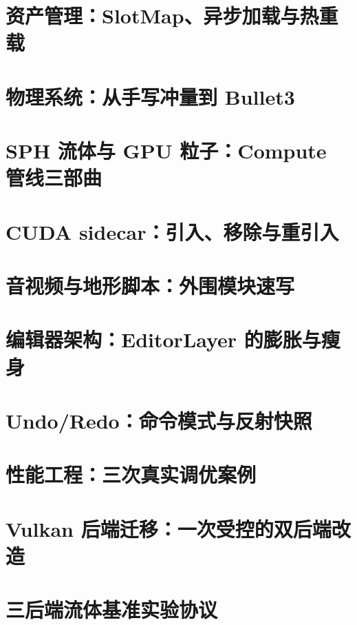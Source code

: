 \documentclass[%
  lang=cn,          %
  newtx,            %
  12pt,             %
  oneside,          %
  scheme=warmgreen, %
]{elegantbook}
\begin{document}
\chapter{资产管理：SlotMap、异步加载与热重载}
\label{ch:asset}


\chapter{物理系统：从手写冲量到 Bullet3}
\label{ch:physics}


\chapter{SPH 流体与 GPU 粒子：Compute 管线三部曲}
\label{ch:sph-gpu}


\chapter{CUDA sidecar：引入、移除与重引入}
\label{ch:cuda-sidecar}


\chapter{音视频与地形脚本：外围模块速写}
\label{ch:peripherals}


\chapter{编辑器架构：EditorLayer 的膨胀与瘦身}
\label{ch:editor}


\chapter{Undo/Redo：命令模式与反射快照}
\label{ch:undo}


\chapter{性能工程：三次真实调优案例}
\label{ch:performance}


\chapter{Vulkan 后端迁移：一次受控的双后端改造}
\label{ch:vulkan}


\appendix
\chapter{三后端流体基准实验协议}


\backmatter
% 
\end{document}
